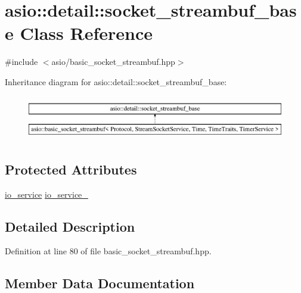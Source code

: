 \hypertarget{classasio_1_1detail_1_1socket__streambuf__base}{}\section{asio\+:\+:detail\+:\+:socket\+\_\+streambuf\+\_\+base Class Reference}
\label{classasio_1_1detail_1_1socket__streambuf__base}


{\ttfamily \#include $<$asio/basic\+\_\+socket\+\_\+streambuf.\+hpp$>$}

Inheritance diagram for asio\+:\+:detail\+:\+:socket\+\_\+streambuf\+\_\+base\+:\begin{figure}[H]
\begin{center}
\leavevmode
\includegraphics[height=1.964912cm]{classasio_1_1detail_1_1socket__streambuf__base}
\end{center}
\end{figure}
\subsection*{Protected Attributes}
\begin{DoxyCompactItemize}
\item 
\hyperlink{classasio_1_1io__service}{io\+\_\+service} \hyperlink{classasio_1_1detail_1_1socket__streambuf__base_a8743e8a5e39a4d1cc57459ee59306a19}{io\+\_\+service\+\_\+}
\end{DoxyCompactItemize}


\subsection{Detailed Description}


Definition at line 80 of file basic\+\_\+socket\+\_\+streambuf.\+hpp.



\subsection{Member Data Documentation}
\hypertarget{classasio_1_1detail_1_1socket__streambuf__base_a8743e8a5e39a4d1cc57459ee59306a19}{}
